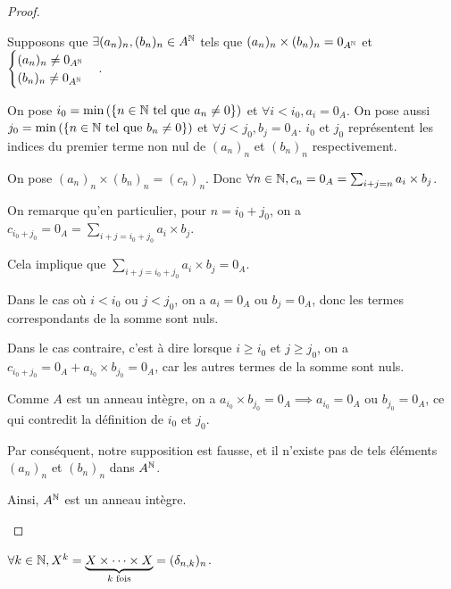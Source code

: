 \documentclass[12pt,a4paper]{report}
\begin{document}
\begin{proof}
    \begin{outline}
        \1 Supposons que $\exists (a_n)_n, (b_n)_n \in A^{\mathbb{N}}$ tels que $(a_n)_n \times (b_n)_n = 0_{A^{\mathbb{N}}}$ et $\begin{cases} (a_n)_n \neq 0_{A^{\mathbb{N}}}\\ (b_n)_n \neq 0_{A^{\mathbb{N}}} \end{cases}$.

    \1 On pose $i_0 = \min\left(\{n\in\mathbb{N} \text{ tel que } a_n \ne 0\}\right)$ et $\forall i < i_0, a_i = 0_A$. On pose aussi $j_0 = \min\left(\{n\in\mathbb{N} \text{ tel que } b_n \ne 0\}\right)$ et $\forall j < j_0, b_j = 0_A$. $i_0$ et $j_0$ représentent les indices du premier terme non nul de $(a_n)_n$ et $(b_n)_n$ respectivement.

    \1 On pose $(a_n)_n \times (b_n)_n = (c_n)_n$. Donc $\forall n \in \mathbb{N}, c_n = 0_A = \sum_{i+j=n} a_i \times b_j$.

    \2 On remarque qu'en particulier, pour $n = i_0 + j_0$, on a $c_{i_0 + j_0} = 0_A = \sum_{i+j=i_0+j_0} a_i \times b_j$.

    \2 Cela implique que $\sum_{i+j=i_0+j_0} a_i \times b_j = 0_A$.
    
    \3 Dans le cas où $i < i_0$ ou $j < j_0$, on a $a_i = 0_A$ ou $b_j = 0_A$, donc les termes correspondants de la somme sont nuls.

    \3 Dans le cas contraire, c'est à dire lorsque $i \ge i_0$ et $j \ge j_0$, on a $c_{i_0 + j_0} = 0_A + a_{i_0} \times b_{j_0} = 0_A$, car les autres termes de la somme sont nuls.

    \2 Comme $A$ est un anneau intègre, on a $a_{i_0} \times b_{j_0} = 0_A \implies a_{i_0} = 0_A$ ou $b_{j_0} = 0_A$, ce qui contredit la définition de $i_0$ et $j_0$.

    \1 Par conséquent, notre supposition est fausse, et il n'existe pas de tels éléments $(a_n)_n$ et $(b_n)_n$ dans $A^{\mathbb{N}}$.

    \1 Ainsi, $A^{\mathbb{N}}$ est un anneau intègre.
    \end{outline}
\end{proof}

\begin{property}
    $\forall k \in \mathbb{N}, X^k = \underbrace{X\times\dots\times X}_{k\text{ fois}} = (\delta_{n,k})_n$.
\end{property}
\end{document}
